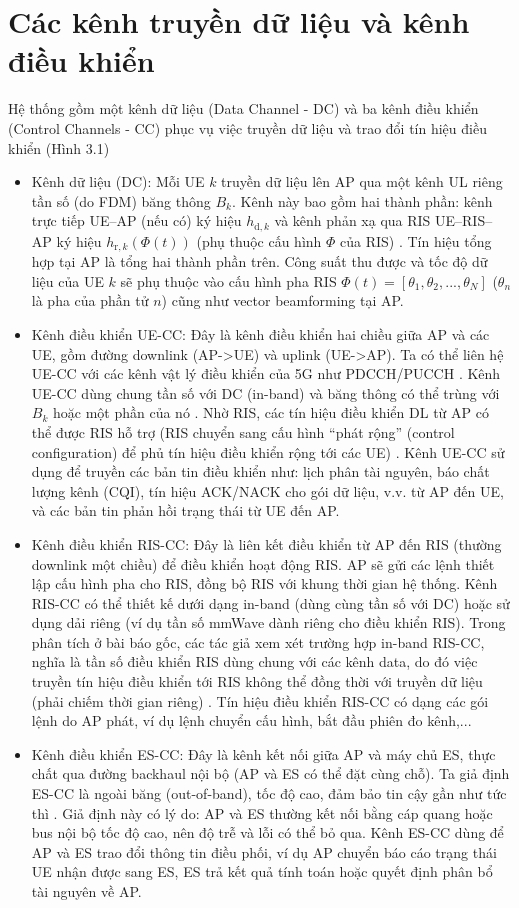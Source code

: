\section{Các kênh truyền dữ liệu và kênh điều khiển}

Hệ thống gồm một kênh dữ liệu (Data Channel - DC) và ba kênh điều khiển (Control Channels - CC) phục vụ việc truyền dữ liệu và trao đổi tín hiệu điều khiển (Hình 3.1)
\begin{itemize}
    \item Kênh dữ liệu (DC): Mỗi UE $k$ truyền dữ liệu lên AP qua một kênh UL riêng tần số (do FDM) băng thông $B_k$. Kênh này bao gồm hai thành phần: kênh trực tiếp UE–AP (nếu có) ký hiệu $h_{\text{d},k}$ và kênh phản xạ qua RIS UE–RIS–AP ký hiệu $h_{\text{r},k}(\Phi(t))$ (phụ thuộc cấu hình $\Phi$ của RIS)
. Tín hiệu tổng hợp tại AP là tổng hai thành phần trên. Công suất thu được và tốc độ dữ liệu của UE $k$ sẽ phụ thuộc vào cấu hình pha RIS $\Phi(t) = [\theta_1, \theta_2, ..., \theta_N]$ ($\theta_n$ là pha của phần tử $n$) cũng như vector beamforming tại AP.\cite{ris_latency}
    \item Kênh điều khiển UE-CC: Đây là kênh điều khiển hai chiều giữa AP và các UE, gồm đường downlink (AP->UE) và uplink (UE->AP). Ta có thể liên hệ UE-CC với các kênh vật lý điều khiển của 5G như PDCCH/PUCCH
\cite{ris_latency}
. Kênh UE-CC dùng chung tần số với DC (in-band) và băng thông có thể trùng với $B_k$ hoặc một phần của nó
. Nhờ RIS, các tín hiệu điều khiển DL từ AP có thể được RIS hỗ trợ (RIS chuyển sang cấu hình “phát rộng” (control configuration) để phủ tín hiệu điều khiển rộng tới các UE)
. Kênh UE-CC sử dụng để truyền các bản tin điều khiển như: lịch phân tài nguyên, báo chất lượng kênh (CQI), tín hiệu ACK/NACK cho gói dữ liệu, v.v. từ AP đến UE, và các bản tin phản hồi trạng thái từ UE đến AP.
    \item Kênh điều khiển RIS-CC: Đây là liên kết điều khiển từ AP đến RIS (thường downlink một chiều) để điều khiển hoạt động RIS. AP sẽ gửi các lệnh thiết lập cấu hình pha cho RIS, đồng bộ RIS với khung thời gian hệ thống. Kênh RIS-CC có thể thiết kế dưới dạng in-band (dùng cùng tần số với DC) hoặc sử dụng dải riêng (ví dụ tần số mmWave dành riêng cho điều khiển RIS). Trong phân tích ở bài báo gốc, các tác giả xem xét trường hợp in-band RIS-CC, nghĩa là tần số điều khiển RIS dùng chung với các kênh data, do đó việc truyền tín hiệu điều khiển tới RIS không thể đồng thời với truyền dữ liệu (phải chiếm thời gian riêng)
\cite{ris_latency}
. Tín hiệu điều khiển RIS-CC có dạng các gói lệnh do AP phát, ví dụ lệnh chuyển cấu hình, bắt đầu phiên đo kênh,...
    \item Kênh điều khiển ES-CC: Đây là kênh kết nối giữa AP và máy chủ ES, thực chất qua đường backhaul nội bộ (AP và ES có thể đặt cùng chỗ). Ta giả định ES-CC là ngoài băng (out-of-band), tốc độ cao, đảm bảo tin cậy gần như tức thì
\cite{ris_latency}
. Giả định này có lý do: AP và ES thường kết nối bằng cáp quang hoặc bus nội bộ tốc độ cao, nên độ trễ và lỗi có thể bỏ qua. Kênh ES-CC dùng để AP và ES trao đổi thông tin điều phối, ví dụ AP chuyển báo cáo trạng thái UE nhận được sang ES, ES trả kết quả tính toán hoặc quyết định phân bổ tài nguyên về AP.
\end{itemize}

